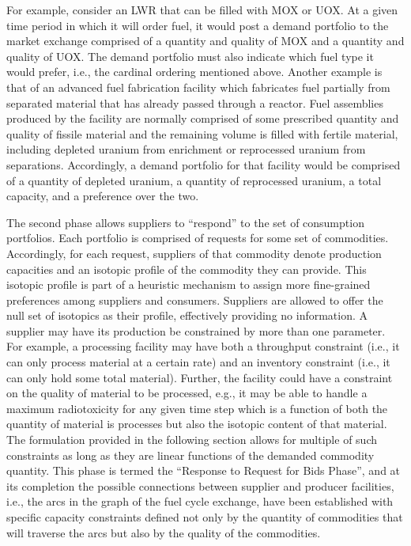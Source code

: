 For example, consider an LWR that can be filled with MOX or UOX. At a given time
period in which it will order fuel, it would post a demand portfolio to the
market exchange comprised of a quantity and quality of MOX and a quantity and
quality of UOX. The demand portfolio must also indicate which fuel type it would
prefer, i.e., the cardinal ordering mentioned above. Another example is that of
an advanced fuel fabrication facility which fabricates fuel partially from
separated material that has already passed through a reactor. Fuel assemblies
produced by the facility are normally comprised of some prescribed quantity and
quality of fissile material and the remaining volume is filled with fertile
material, including depleted uranium from enrichment or reprocessed uranium from
separations. Accordingly, a demand portfolio for that facility would be
comprised of a quantity of depleted uranium, a quantity of reprocessed uranium,
a total capacity, and a preference over the two.

The second phase allows suppliers to ``respond'' to the set of consumption
portfolios. Each portfolio is comprised of requests for some set of
commodities. Accordingly, for each request, suppliers of that commodity denote
production capacities and an isotopic profile of the commodity they can
provide. This isotopic profile is part of a heuristic mechanism to assign more
fine-grained preferences among suppliers and consumers. Suppliers are allowed to
offer the null set of isotopics as their profile, effectively providing no
information. A supplier may have its production be constrained by more than one
parameter. For example, a processing facility may have both a throughput
constraint (i.e., it can only process material at a certain rate) and an
inventory constraint (i.e., it can only hold some total material). Further, the
facility could have a constraint on the quality of material to be processed,
e.g., it may be able to handle a maximum radiotoxicity for any given time step
which is a function of both the quantity of material is processes but also the
isotopic content of that material. The formulation provided in the following
section allows for multiple of such constraints as long as they are linear
functions of the demanded commodity quantity. This phase is termed the
``Response to Request for Bids Phase'', and at its completion the possible
connections between supplier and producer facilities, i.e., the arcs in the
graph of the fuel cycle exchange, have been established with specific capacity
constraints defined not only by the quantity of commodities that will traverse
the arcs but also by the quality of the commodities.

